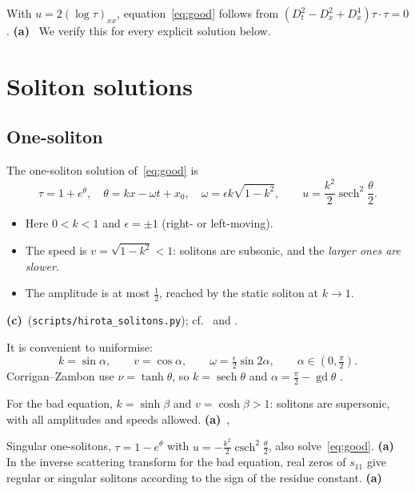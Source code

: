 \documentclass[11pt,a4paper]{article}
\newcommand{\La}{\textsf{\textbf{(a)}}}
\newcommand{\Lc}{\textsf{\textbf{(c)}}}
\newcommand{\script}[1]{\texttt{scripts/#1}}
\theoremstyle{remark}
\begin{document}
With $u=2(\log\tau)_{xx}$, equation~\eqref{eq:good} follows from $(D_t^2-D_x^2+D_x^4)\tau\cdot\tau=0$. \La~\cite{Hirota73} We verify this for every explicit solution below.

\section{Soliton solutions}\label{sec:solitons}

\subsection{One-soliton}

The one-soliton solution of~\eqref{eq:good} is
\begin{equation}\label{eq:1sol}
\tau=1+e^{\theta},\quad \theta=kx-\omega t+x_0,\quad \omega=\epsilon k\sqrt{1-k^2},\qquad u=\frac{k^2}{2}\operatorname{sech}^2\frac{\theta}{2} .
\end{equation}
\begin{itemize}
\item Here $0<k<1$ and $\epsilon=\pm1$ (right- or left-moving).
\item The speed is $v=\sqrt{1-k^2}<1$: solitons are subsonic, and the \emph{larger ones are slower}.
\item The amplitude is at most $\frac12$, reached by the static soliton at $k\to1$.
\end{itemize}
\Lc\ (\script{hirota\_solitons.py}); cf.\ \cite[(18)]{BD} and \cite[(2.8)]{CZ}.

It is convenient to uniformise:
\begin{equation}\label{eq:alpha}
k=\sin\alpha,\qquad v=\cos\alpha,\qquad \omega=\tfrac{\epsilon}{2}\sin2\alpha,\qquad \alpha\in(0,\tfrac\pi2).
\end{equation}
Corrigan--Zambon use $\nu=\tanh\theta$, so $k=\operatorname{sech}\theta$ and $\alpha=\tfrac\pi2-\operatorname{gd}\theta$ \cite[(5.6)--(5.8)]{CZ}.

For the bad equation, $k=\sinh\beta$ and $v=\cosh\beta>1$: solitons are supersonic, with all amplitudes and speeds allowed. \La~\cite[(A.8)]{CL-SOL}, \cite[(11)]{BC}

Singular one-solitons, $\tau=1-e^\theta$ with $u=-\frac{k^2}2\operatorname{csch}^2\frac\theta2$, also solve~\eqref{eq:good}. \La~\cite{RS} In the inverse scattering transform for the bad equation, real zeros of $s_{11}$ give regular or singular solitons according to the sign of the residue constant. \La~\cite[Lemma A.3]{CL-SOL}
\end{document}
